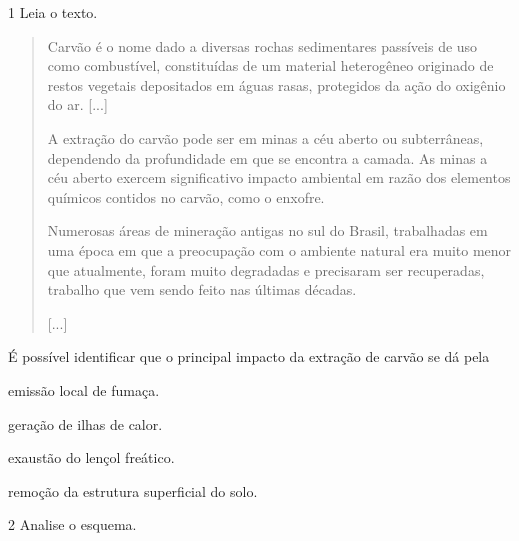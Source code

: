 \num{1} Leia o texto.

\begin{quote}
Carvão é o nome dado a diversas rochas sedimentares passíveis
de uso como combustível, constituídas de um material heterogêneo
originado de restos vegetais depositados em águas rasas, protegidos da
ação do oxigênio do ar. {[}...{]}

A extração do carvão pode ser em minas a céu aberto ou
subterrâneas, dependendo da profundidade em que se encontra a camada. As
minas a céu aberto exercem significativo impacto ambiental em razão dos
elementos químicos contidos no carvão, como o enxofre.

Numerosas áreas de mineração antigas no sul do Brasil, trabalhadas
em uma época em que a preocupação com o ambiente natural era muito menor
que atualmente, foram muito degradadas e precisaram ser recuperadas,
trabalho que vem sendo feito nas últimas décadas.

{[}...{]}

\end{quote}

É possível identificar que o principal impacto da extração de carvão se dá pela

\begin{escolha}
\item
  emissão local de fumaça.
\item
  geração de ilhas de calor.
\item
  exaustão do lençol freático.
\item
  remoção da estrutura superficial do solo.
\end{escolha}


\num{2} Analise o esquema.

